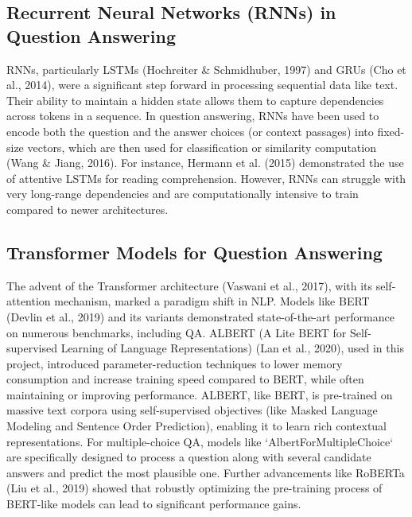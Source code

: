 \documentclass[10.5pt]{article}
\begin{document}
\subsection{Recurrent Neural Networks (RNNs) in Question Answering}
RNNs, particularly LSTMs (Hochreiter \& Schmidhuber, 1997) and GRUs (Cho et al., 2014), were a significant step forward in processing sequential data like text. Their ability to maintain a hidden state allows them to capture dependencies across tokens in a sequence. In question answering, RNNs have been used to encode both the question and the answer choices (or context passages) into fixed-size vectors, which are then used for classification or similarity computation (Wang \& Jiang, 2016). For instance, Hermann et al. (2015) demonstrated the use of attentive LSTMs for reading comprehension. However, RNNs can struggle with very long-range dependencies and are computationally intensive to train compared to newer architectures.

\subsection{Transformer Models for Question Answering}
The advent of the Transformer architecture (Vaswani et al., 2017), with its self-attention mechanism, marked a paradigm shift in NLP. Models like BERT (Devlin et al., 2019) and its variants demonstrated state-of-the-art performance on numerous benchmarks, including QA. ALBERT (A Lite BERT for Self-supervised Learning of Language Representations) (Lan et al., 2020), used in this project, introduced parameter-reduction techniques to lower memory consumption and increase training speed compared to BERT, while often maintaining or improving performance. ALBERT, like BERT, is pre-trained on massive text corpora using self-supervised objectives (like Masked Language Modeling and Sentence Order Prediction), enabling it to learn rich contextual representations. For multiple-choice QA, models like `AlbertForMultipleChoice` are specifically designed to process a question along with several candidate answers and predict the most plausible one. Further advancements like RoBERTa (Liu et al., 2019) showed that robustly optimizing the pre-training process of BERT-like models can lead to significant performance gains.
\end{document}
